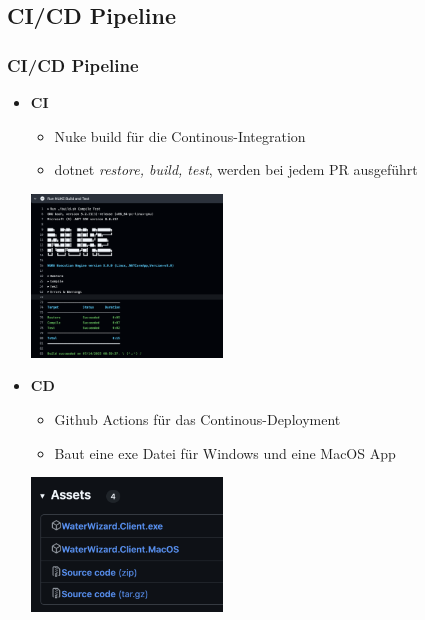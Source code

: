 \documentclass{beamer}
\begin{document}
\subsection{CI/CD Pipeline}
\begin{frame}
\frametitle{CI/CD Pipeline}
  \begin{multicols}{2}
    \begin{itemize}
      \item \textbf{CI}
        \begin{itemize}
          \item Nuke build für die Continous-Integration
          \item dotnet \textit{restore, build, test}, werden bei jedem PR ausgeführt
        \end{itemize}
      \includegraphics[width=0.4\textwidth]{Nuke-Pipeline.png}
    \end{itemize}
  \columnbreak
    \begin{itemize}
      \item \textbf{CD}
        \begin{itemize}
          \item Github Actions für das Continous-Deployment
          \item Baut eine exe Datei für Windows und eine MacOS App 
        \end{itemize}
        \includegraphics[width=0.4\textwidth]{CD-in-GH.png}
    \end{itemize}
  \end{multicols}
\end{frame}
\end{document}
